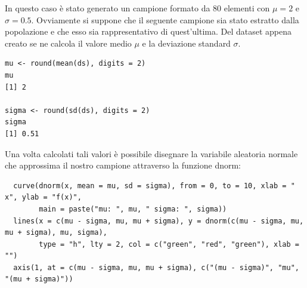 In questo caso è stato generato un campione formato da 80 elementi con $\mu = 2$ e $\sigma = 0.5$.
Ovviamente si suppone che il seguente campione sia stato estratto dalla popolazione e che esso sia rappresentativo di quest'ultima. Del dataset appena creato se ne calcola il valore medio $\mu$ e la deviazione standard $\sigma$.

\vspace{5mm}
\begin{lstlisting}
mu <- round(mean(ds), digits = 2)
mu
[1] 2

sigma <- round(sd(ds), digits = 2)
sigma
[1] 0.51
\end{lstlisting}
\vspace{5mm}

Una volta calcolati tali valori è possibile disegnare la variabile aleatoria normale che approssima il nostro campione attraverso la funzione dnorm:

\vspace{5mm}
\begin{lstlisting}
  curve(dnorm(x, mean = mu, sd = sigma), from = 0, to = 10, xlab = " x", ylab = "f(x)",
        main = paste("mu: ", mu, " sigma: ", sigma))
  lines(x = c(mu - sigma, mu, mu + sigma), y = dnorm(c(mu - sigma, mu, mu + sigma), mu, sigma),
        type = "h", lty = 2, col = c("green", "red", "green"), xlab = "")
  axis(1, at = c(mu - sigma, mu, mu + sigma), c("(mu - sigma)", "mu", "(mu + sigma)"))
\end{lstlisting}
\vspace{5mm}

